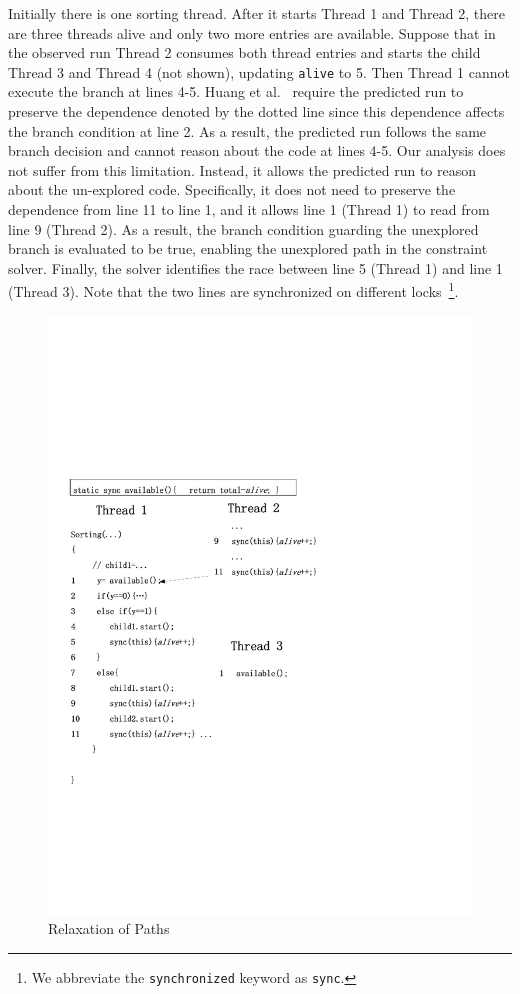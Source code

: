  
Initially there is one sorting thread. After it starts Thread 1 and Thread 2, there are three threads alive and only two more entries are available.
Suppose that in the observed run Thread 2 consumes both thread entries and starts the child Thread 3 and Thread 4 (not shown), updating {\tt alive} to 5. Then Thread 1 cannot execute the branch at lines 4-5. Huang et al.~\cite{} require the predicted run to preserve the dependence denoted by the dotted line since this dependence affects the branch condition at line 2. As a result, the predicted run follows the same branch decision and cannot reason about the code at lines 4-5. Our analysis does not suffer from this limitation. Instead, it allows the predicted run to reason about the un-explored code. Specifically, it does not need to preserve the dependence from line 11 to line 1, and it allows line 1 (Thread 1) to read from line 9 (Thread 2). As a result, the branch condition guarding the unexplored branch is evaluated to be true, enabling the unexplored path in the constraint solver. Finally, the solver identifies the race between line 5 (Thread 1) and line 1 (Thread 3). Note that the two lines are synchronized on different locks~\footnote{We abbreviate the {\tt synchronized} keyword as {\tt sync}.
}. 

 


\begin{figure}[htp]
\centering
\includegraphics[scale=0.45]{cases/Visio-msort.pdf}
\caption{Relaxation of Paths}\label{fig:relax2}
\end{figure}


